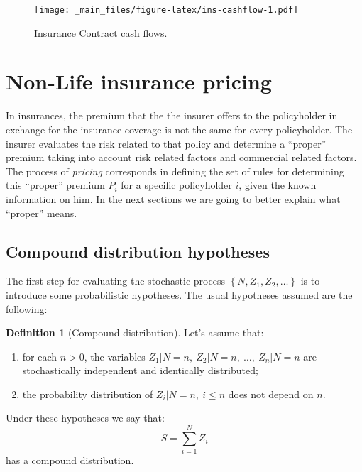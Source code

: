 \documentclass[a4paper, nobind]{templates/ociamthesis}
\providecommand{\tightlist}{%
  \setlength{\itemsep}{0pt}\setlength{\parskip}{0pt}}
\theoremstyle{definition}
\newtheorem{definition}{Definition}[chapter]
\theoremstyle{definition}
\theoremstyle{definition}
\theoremstyle{remark}
\begin{document}
\begin{figure}
\centering
\texttt{[image: \_main\_files/figure-latex/ins-cashflow-1.pdf]}
\caption{\label{fig:ins-cashflow}Insurance Contract cash flows.}
\end{figure}

\hypertarget{non-life-insurance-pricing}{%
\section{Non-Life insurance pricing}\label{non-life-insurance-pricing}}

In insurances, the premium that the the insurer offers to the policyholder in exchange for the insurance coverage is not the same for every policyholder. The insurer evaluates the risk related to that policy and determine a ``proper'' premium taking into account risk related factors and commercial related factors. The process of \emph{pricing} corresponds in defining the set of rules for determining this ``proper'' premium \(P_i\) for a specific policyholder \(i\), given the known information on him. In the next sections we are going to better explain what ``proper'' means.

\hypertarget{compound-distribution-hypotheses}{%
\subsection{Compound distribution hypotheses}\label{compound-distribution-hypotheses}}

The first step for evaluating the stochastic process \(\left\{N, Z_1, Z_2, \dots \right\}\) is to introduce some probabilistic hypotheses. The usual hypotheses assumed are the following:

\begin{definition}[Compound distribution]
\label{def:comp-dist} \iffalse (Compound distribution) \fi{}
Let's assume that:

\begin{enumerate}
\def\labelenumi{\arabic{enumi}.}
\tightlist
\item
  for each \(n>0\), the variables \(Z_1|N=n,\ Z_2|N=n,\ \dots,\ Z_n|N=n\) are stochastically independent and identically distributed;
\item
  the probability distribution of \(Z_i|N=n, \ i\le n\) does not depend on \(n\).
\end{enumerate}

Under these hypotheses we say that:
\[
S = \sum_{i=1}^{N}{Z_i}
\]
has a compound distribution.
\end{definition}
\end{document}
